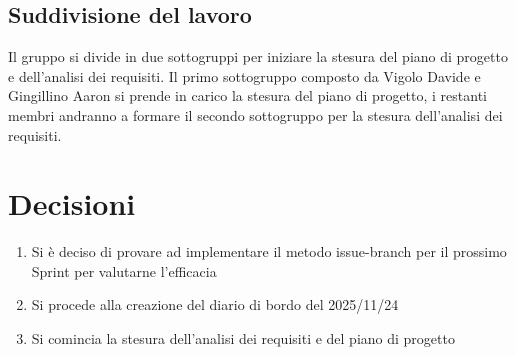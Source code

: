 \documentclass[a4paper,12pt]{article}
\begin{document}
\subsection{Suddivisione del lavoro}
Il gruppo si divide in due sottogruppi per iniziare la stesura del piano di progetto e dell'analisi dei requisiti.
Il primo sottogruppo composto da Vigolo Davide e Gingillino Aaron si prende in carico la stesura del piano di progetto, i restanti membri andranno a formare il secondo sottogruppo per la stesura dell'analisi dei requisiti.

\section{Decisioni}
\begin{enumerate}[noitemsep]
    \item Si è deciso di provare ad implementare il metodo issue-branch per il prossimo Sprint per valutarne l'efficacia
    \item Si procede alla creazione del diario di bordo del 2025/11/24
    \item Si comincia la stesura dell'analisi dei requisiti e del piano di progetto
\end{enumerate}
\end{document}
